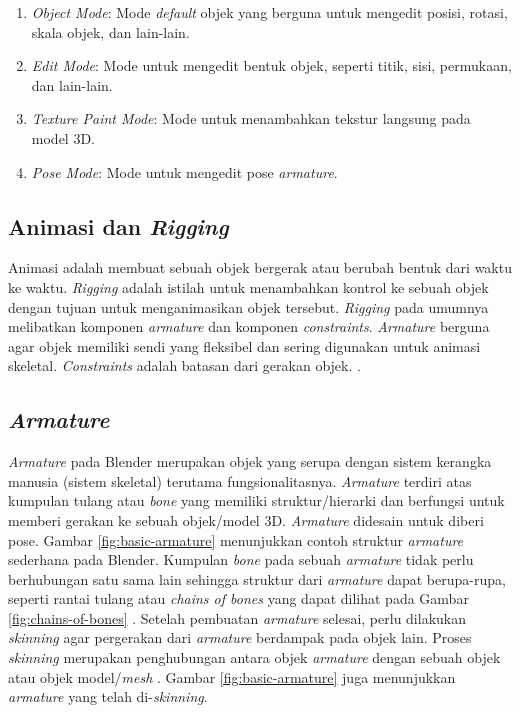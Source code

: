 \begin{enumerate}

    \item \textit{Object Mode}: Mode \textit{default} objek yang berguna untuk
    mengedit posisi, rotasi, skala objek, dan lain-lain.

    \item \textit{Edit Mode}: Mode untuk mengedit bentuk objek, seperti titik,
    sisi, permukaan, dan lain-lain.

    \item \textit{Texture Paint Mode}: Mode untuk menambahkan tekstur langsung
    pada model 3D.

    \item \textit{Pose Mode}: Mode untuk mengedit pose \textit{armature}.

\end{enumerate}

\subsection{Animasi dan \textit{Rigging}}

Animasi adalah membuat sebuah objek
bergerak atau berubah bentuk dari waktu ke waktu. \textit{Rigging} adalah
istilah untuk menambahkan kontrol ke sebuah objek dengan tujuan untuk
menganimasikan objek tersebut. \textit{Rigging} pada umumnya melibatkan komponen
\textit{armature} dan komponen \textit{constraints}. \textit{Armature} berguna
agar objek memiliki sendi yang fleksibel dan sering digunakan untuk animasi
skeletal. \textit{Constraints} adalah batasan dari gerakan objek.
\parencite{blender-animation-and-rigging}.

\subsection{\textit{Armature}}

\textit{Armature} pada Blender merupakan objek yang serupa dengan sistem
kerangka manusia (sistem skeletal) terutama fungsionalitasnya. \textit{Armature}
terdiri atas kumpulan tulang atau \textit{bone} yang memiliki struktur/hierarki
dan berfungsi untuk memberi gerakan ke sebuah objek/model 3D. \textit{Armature}
didesain untuk diberi pose. Gambar \ref{fig:basic-armature} menunjukkan contoh
struktur \textit{armature} sederhana pada Blender. Kumpulan \textit{bone} pada
sebuah \textit{armature} tidak perlu berhubungan satu sama lain sehingga
struktur dari \textit{armature} dapat berupa-rupa, seperti rantai
tulang atau \textit{chains of bones} yang dapat dilihat pada Gambar
\ref{fig:chains-of-bones} \parencite{blender-armature-introduction,
blender-armature-structure}. Setelah pembuatan \textit{armature} selesai, perlu
dilakukan \textit{skinning} agar pergerakan dari \textit{armature} berdampak
pada objek lain. Proses \textit{skinning} merupakan penghubungan antara objek
\textit{armature} dengan sebuah objek atau objek model/\textit{mesh}
\parencite{blender-skinning-introduction}. Gambar \ref{fig:basic-armature} juga
menunjukkan \textit{armature} yang telah di-\textit{skinning}.

